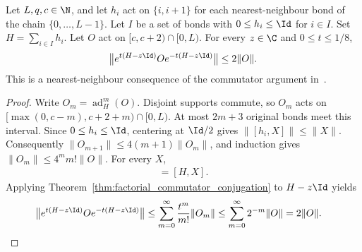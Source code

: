 \begin{theorem}
    \label{thm:chain_local_imaginary_time}
    \leanok
    Let $L,q,c\in\N$, and let $h_i$ act on $\{i,i+1\}$ for each
    nearest-neighbour bond of the chain $\{0,\ldots,L-1\}$. Let $I$ be a
    set of bonds with $0\le h_i\le\Id$ for $i\in I$. Set
    $H=\sum_{i\in I}h_i$.
    Let $O$ act on $\lbrack c,c+2)\cap\lbrack 0,L)$. For every $z\in\C$ and
    $0\le t\le1/8$,
    \begin{align}
        \bigl\lVert e^{t(H-z\Id)}Oe^{-t(H-z\Id)}\bigr\rVert
        \le 2\lVert O\rVert.
    \end{align}
    This is a nearest-neighbour consequence of the commutator argument
    in~\cite[lines 795--880]{Arad2014Connecting}.
\end{theorem}
\begin{proof}\leanok
    Write $O_m=\operatorname{ad}_H^m(O)$. Disjoint supports commute, so $O_m$
    acts on $\lbrack \max(0,c-m),c+2+m)\cap\lbrack 0,L)$. At most $2m+3$ original bonds
    meet this interval. Since $0\le h_i\le\Id$, centering at $\Id/2$ gives
    $\lVert[h_i,X]\rVert\le\lVert X\rVert$. Consequently
    $\lVert O_{m+1}\rVert\le4(m+1)\lVert O_m\rVert$, and induction gives
    $\lVert O_m\rVert\le4^m m!\lVert O\rVert$. For every $X$,
    \begin{align}
        [H-z\Id,X]=[H,X].
    \end{align}
    Applying Theorem~\ref{thm:factorial_commutator_conjugation} to $H-z\Id$ yields
    \begin{align}
        \bigl\lVert e^{t(H-z\Id)}Oe^{-t(H-z\Id)}\bigr\rVert
         & \le\sum_{m=0}^{\infty}\frac{t^m}{m!}\lVert O_m\rVert
        \le\sum_{m=0}^{\infty}2^{-m}\lVert O\rVert
        =2\lVert O\rVert.
    \end{align}
\end{proof}


